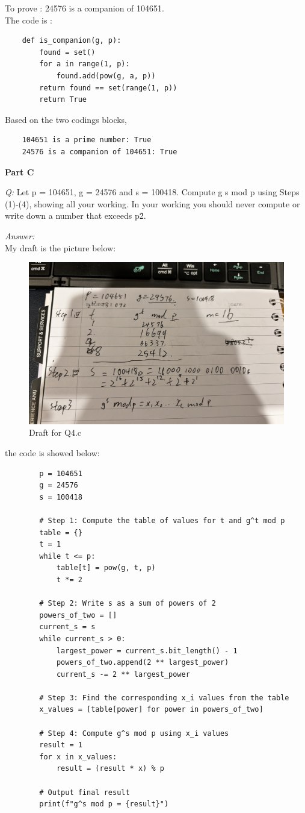 \documentclass{article}
\begin{document}
	To prove :  24576 is a companion of 104651.\\
	The code is :
	\begin{lstlisting}
	def is_companion(g, p):
		found = set()
		for a in range(1, p):
			found.add(pow(g, a, p))
		return found == set(range(1, p))
		return True
	\end{lstlisting}
	\par
	\par
	Based on the two codings blocks, \\
	
	\begin{lstlisting}
	104651 is a prime number: True
	24576 is a companion of 104651: True
	\end{lstlisting}
	\par 
	\par 
	
	
	\textbf{Part C}
	
	\textit{Q:} Let p = 104651, g = 24576 and s = 100418. Compute g
	s mod p using Steps (1)-(4), showing all your working. In your working you should never compute or write down a number that exceeds p\^2.
	
	\textit{Answer:} \\
	My draft is the picture below:
	\begin{figure}[H]
		\centering
		\includegraphics[width=0.75\linewidth]{4c.jpg}
		\caption{Draft for Q4.c}
	\end{figure}
	
	the code is showed below:
	
	\begin{lstlisting}
		p = 104651
		g = 24576
		s = 100418
		
		# Step 1: Compute the table of values for t and g^t mod p
		table = {}
		t = 1
		while t <= p:
			table[t] = pow(g, t, p)
			t *= 2
		
		# Step 2: Write s as a sum of powers of 2
		powers_of_two = []
		current_s = s
		while current_s > 0:
			largest_power = current_s.bit_length() - 1
			powers_of_two.append(2 ** largest_power)
			current_s -= 2 ** largest_power
		
		# Step 3: Find the corresponding x_i values from the table
		x_values = [table[power] for power in powers_of_two]
		
		# Step 4: Compute g^s mod p using x_i values
		result = 1
		for x in x_values:
			result = (result * x) % p
		
		# Output final result
		print(f"g^s mod p = {result}")
		
	\end{lstlisting}
	
\end{document}
